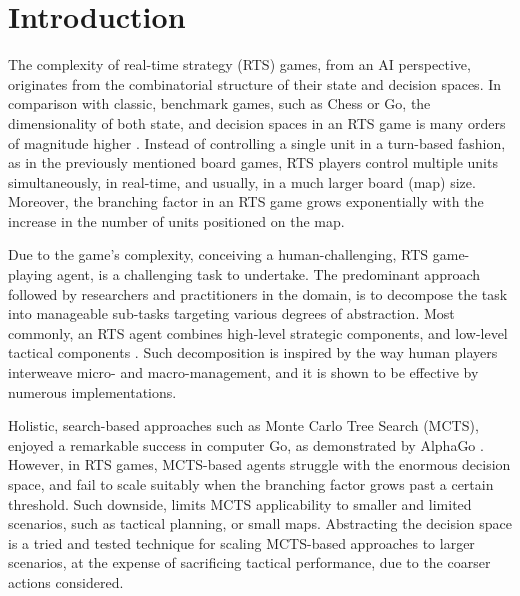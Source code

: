 \documentclass[conference]{IEEEtran}
\begin{document}
\begin{IEEEkeywords}

\end{IEEEkeywords}



\section{Introduction}
\label{sec:introduction}

The complexity of real-time strategy (RTS) games, from an AI perspective, originates from the combinatorial structure of their state and decision spaces. In comparison with classic, benchmark games, such as Chess or Go, the dimensionality of both state, and decision spaces in an RTS game is many orders of magnitude higher \cite{ontanon_survey_2013}. Instead of controlling a single unit in a turn-based fashion, as in the previously mentioned board games, RTS players control multiple units simultaneously, in real-time, and usually, in a much larger board (map) size. Moreover, the branching factor in an RTS game grows exponentially with the increase in the number of units positioned on the map.

Due to the game's complexity, conceiving a human-challenging, RTS game-playing agent, is a challenging task to undertake. The predominant approach followed by researchers and practitioners in the domain, is to decompose the task into manageable sub-tasks targeting various degrees of abstraction. Most commonly, an RTS agent combines high-level strategic components, and low-level tactical components \cite{barriga_combining_2017}. Such decomposition is inspired by the way human players interweave micro- and macro-management, and it is shown to be effective by numerous implementations.

Holistic, search-based approaches such as Monte Carlo Tree Search (MCTS), enjoyed a remarkable success in computer Go, as demonstrated by AlphaGo \cite{silver_mastering_2016}.
 However, in RTS games, MCTS-based agents struggle with the enormous decision space, and fail to scale suitably when the branching factor grows past a certain threshold. Such downside, limits MCTS applicability to smaller and limited scenarios, such as tactical planning, or small maps. Abstracting the decision space is a tried and tested technique for scaling MCTS-based approaches to larger scenarios, 
at the expense of sacrificing tactical performance, due to the coarser actions considered.
\end{document}
